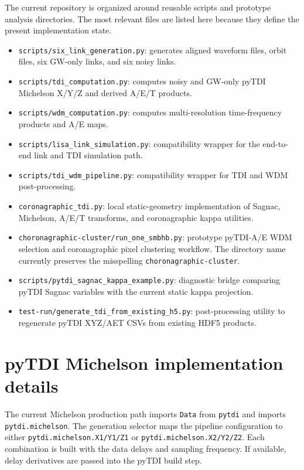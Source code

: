\documentclass[%
 reprint,
 amsmath,amssymb,
 aps,
 prd,
]{revtex4-2}
\begin{document}
The current repository is organized around reusable scripts and prototype analysis directories.  The most relevant files are listed here because they define the present implementation state.

\begin{itemize}
\item \texttt{scripts/six\_link\_generation.py}: generates aligned waveform files, orbit files, six GW-only links, and six noisy links.
\item \texttt{scripts/tdi\_computation.py}: computes noisy and GW-only pyTDI Michelson X/Y/Z and derived A/E/T products.
\item \texttt{scripts/wdm\_computation.py}: computes multi-resolution time-frequency products and A/E maps.
\item \texttt{scripts/lisa\_link\_simulation.py}: compatibility wrapper for the end-to-end link and TDI simulation path.
\item \texttt{scripts/tdi\_wdm\_pipeline.py}: compatibility wrapper for TDI and WDM post-processing.
\item \texttt{coronagraphic\_tdi.py}: local static-geometry implementation of Sagnac, Michelson, A/E/T transforms, and coronagraphic kappa utilities.
\item \texttt{choronagraphic-cluster/run\_one\_smbhb.py}: prototype pyTDI-A/E WDM selection and coronagraphic pixel clustering workflow.  The directory name currently preserves the misspelling \texttt{choronagraphic-cluster}.
\item \texttt{scripts/pytdi\_sagnac\_kappa\_example.py}: diagnostic bridge comparing pyTDI Sagnac variables with the current static kappa projection.
\item \texttt{test-run/generate\_tdi\_from\_existing\_h5.py}: post-processing utility to regenerate pyTDI XYZ/AET CSVs from existing HDF5 products.
\end{itemize}

\section{pyTDI Michelson implementation details}
\label{app:pytdi_michelson}

The current Michelson production path imports \texttt{Data} from \texttt{pytdi} and imports \texttt{pytdi.michelson}.  The generation selector maps the pipeline configuration to either \texttt{pytdi.michelson.X1/Y1/Z1} or \texttt{pytdi.michelson.X2/Y2/Z2}.  Each combination is built with the data delays and sampling frequency.  If available, delay derivatives are passed into the pyTDI build step.
\end{document}
